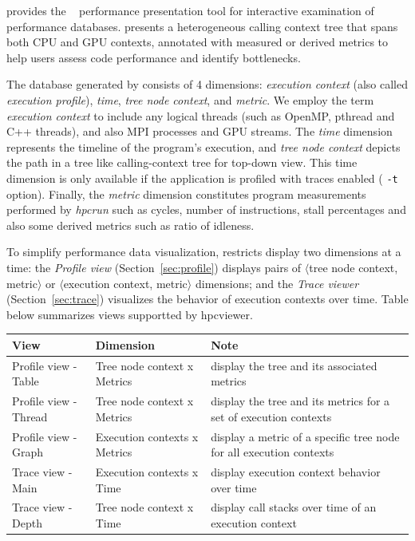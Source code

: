 

\HPCToolkit{} provides the \hpcviewer{}~\cite{Adhianto-MC-Ta:2010:PSTI-hpcviewer,Tallent-MC-etal:2011:ICS-hpctoolkit-scalable-tracing} performance presentation tool for interactive examination of performance databases.
\hpcviewer{}  presents a heterogeneous
calling context tree that spans both CPU and GPU contexts, annotated
with measured or derived metrics to help users assess code performance
and identify bottlenecks.

The database generated by \hpcprof{} consists of 4 dimensions: \emph{execution context} (also called \emph{execution profile}), \emph{time}, \emph{tree node context}, and \emph{metric}.
We employ the term \emph{execution context} to include any logical threads (such as OpenMP, pthread and C++ threads), and also MPI processes and GPU streams.
The \emph{time} dimension represents the timeline of the program's execution, and \emph{tree node context} depicts the path in a tree like calling-context tree for top-down view.
This time dimension is only available if the application is profiled with traces enabled (\hpcrun{} \texttt{-t} option).
Finally, the \emph{metric} dimension constitutes program measurements performed by \textit{hpcrun} such as cycles, number of instructions, stall percentages and also some derived metrics such as ratio of idleness.

To simplify performance data visualization, \hpcviewer{} restricts
display two dimensions at a time: the \emph{Profile view} (Section~\ref{sec:profile}) displays
pairs of $\langle$tree node context, metric$\rangle$ or $\langle$execution context,
metric$\rangle$ dimensions; and the \emph{Trace viewer} (Section~\ref{sec:trace}) visualizes the
behavior of execution contexts over time.
Table below summarizes views supportted by hpcviewer.

\begin{center}
  \begin{tabular}{|l|p{1.3in}|p{3in}|}\hline\hline
        View & Dimension & Note \\\hline
        Profile view - Table  & Tree node context x Metrics  & display the tree and its associated metrics \\
        Profile view - Thread & Tree node context x Metrics  & display the tree and its metrics for a set of execution contexts \\
        Profile view - Graph  & Execution contexts x Metrics & display a metric of a specific tree node for all execution contexts \\
        Trace view - Main     & Execution contexts x Time    & display execution context behavior over time \\
        Trace view - Depth    & Tree node context  x Time    & display call stacks over time of an execution context \\\hline\hline
  \end{tabular}
\end{center}



